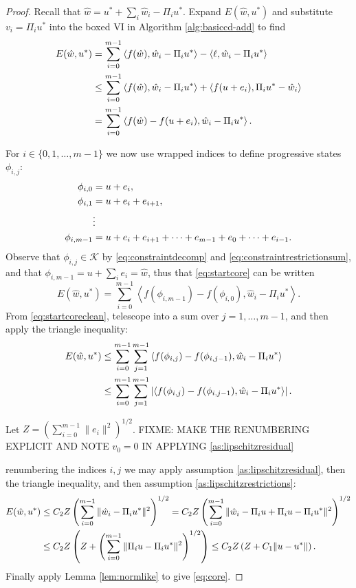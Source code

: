 \documentclass[letterpaper,final,12pt,reqno]{amsart}
\theoremstyle{cstyle}
\theoremstyle{cstyle*}
\theoremstyle{dstyle}
\numberwithin{equation}{section}
\numberwithin{figure}{section}
\numberwithin{table}{section}
\numberwithin{theorem}{section}
\newcommand{\cK}{\mathcal{K}}
\newcommand{\ip}[2]{\left<#1,#2\right>}
\begin{document}
\begin{proof}  Recall that $\hat w = u^* + \sum_i \hat w_i - \Pi_i u^*$.  Expand $E(\hat w,u^*)$ and substitute $v_i = \Pi_i u^*$ into the boxed VI in Algorithm \ref{alg:basiccd-add} to find
\begin{align}
E(\hat w,u^*) &= \sum_{i=0}^{m-1} \ip{f(\hat w)}{\hat w_i - \Pi_i u^*} - \ip{\ell}{\hat w_i - \Pi_i u^*} \notag \\
    &\le \sum_{i=0}^{m-1} \ip{f(\hat w)}{\hat w_i - \Pi_i u^*} + \ip{f(u + e_i)}{\Pi_i u^* - \hat w_i} \notag \\
    &= \sum_{i=0}^{m-1} \ip{f(\hat w) - f(u + e_i)}{\hat w_i - \Pi_i u^*}. \label{eq:startcore}
\end{align}

For $i\in \{0,1,\dots,m-1\}$ we now use wrapped indices to define progressive states $\phi_{i,j}$:
\begin{align}
\phi_{i,0} &= u + e_i, \label{eq:gridcore} \\
\phi_{i,1} &= u + e_i + e_{i+1}, \notag \\
  &\vdots \notag \\
\phi_{i,m-1} &= u + e_i + e_{i+1} + \dots + e_{m-1} + e_0 + \dots + e_{i-1}. \notag
\end{align}
Observe that $\phi_{i,j} \in \cK$ by \eqref{eq:constraintdecomp} and \eqref{eq:constraintrestrictionsum}, and that $\phi_{i,m-1} = u + \sum_i e_i = \hat w$, thus that \eqref{eq:startcore} can be written
\begin{equation}
E(\hat w,u^*) = \sum_{i=0}^{m-1} \ip{f(\phi_{i,m-1}) - f(\phi_{i,0})}{\hat w_i - \Pi_i u^*}. \label{eq:startcoreclean}
\end{equation}
From \eqref{eq:startcoreclean}, telescope into a sum over $j=1,\dots,m-1$, and then apply the triangle inequality:
\begin{align}
E(\hat w,u^*) &\le \sum_{i=0}^{m-1} \sum_{j=1}^{m-1} \ip{f(\phi_{i,j}) - f(\phi_{i,j-1})}{\hat w_i - \Pi_i u^*} \label{eq:nextcore} \\
  &\le \sum_{i=0}^{m-1} \sum_{j=1}^{m-1} \left|\ip{f(\phi_{i,j}) - f(\phi_{i,j-1})}{\hat w_i - \Pi_i u^*}\right|. \notag
\end{align}

Let $Z=\left(\sum_{i=0}^{m-1} \|e_i\|^2\right)^{1/2}$.  FIXME: MAKE THE RENUMBERING EXPLICIT AND NOTE $v_0=0$ IN APPLYING \eqref{as:lipschitzresidual}

renumbering the indices $i,j$ we may apply assumption \eqref{as:lipschitzresidual}, then the triangle inequality, and then assumption \eqref{as:lipschitzrestrictions}:
\begin{align}
E(\hat w,u^*) &\le C_2 Z \left(\sum_{i=0}^{m-1} \|\hat w_i - \Pi_i u^*\|^2\right)^{1/2} = C_2 Z \left(\sum_{i=0}^{m-1} \|\hat w_i - \Pi_i u + \Pi_i u - \Pi_i u^*\|^2\right)^{1/2} \label{eq:nextnextcore} \\
  &\le C_2 Z \left(Z + \left(\sum_{i=0}^{m-1} \|\Pi_i u - \Pi_i u^*\|^2\right)^{1/2}\right) \le C_2 Z \left(Z + C_1 \|u-u^*\|\right). \notag
\end{align}
Finally apply Lemma \ref{lem:normlike} to give \eqref{eq:core}.
\end{proof}
\end{document}
